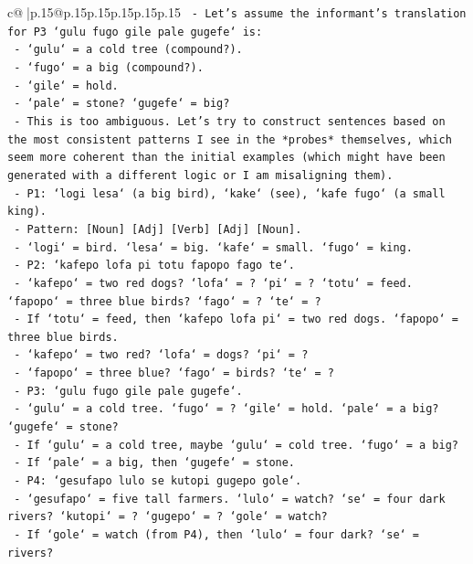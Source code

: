 \documentclass{article}
\begin{document}
{\begin{supertabular}{c@{$\;$}|p{.15\linewidth}@{}p{.15\linewidth}p{.15\linewidth}p{.15\linewidth}p{.15\linewidth}p{.15\linewidth}}
{{{\texttt{  {-} Let's assume the informant's translation for P3 `gulu fugo gile pale gugefe` is:} \\
\texttt{    {-} `gulu` = a cold tree (compound?).} \\
\texttt{    {-} `fugo` = a big (compound?).} \\
\texttt{    {-} `gile` = hold.} \\
\texttt{    {-} `pale` = stone? `gugefe` = big?} \\
\texttt{  {-} This is too ambiguous. Let's try to construct sentences based on the most consistent patterns I see in the *probes* themselves, which seem more coherent than the initial examples (which might have been generated with a different logic or I am misaligning them).} \\
\texttt{  {-} P1: `logi lesa` (a big bird), `kake` (see), `kafe fugo` (a small king).} \\
\texttt{    {-} Pattern: {[}Noun{]} {[}Adj{]} {[}Verb{]} {[}Adj{]} {[}Noun{]}.} \\
\texttt{    {-} `logi` = bird. `lesa` = big. `kafe` = small. `fugo` = king.} \\
\texttt{  {-} P2: `kafepo lofa pi totu fapopo fago te`.} \\
\texttt{    {-} `kafepo` = two red dogs? `lofa` = ? `pi` = ? `totu` = feed. `fapopo` = three blue birds? `fago` = ? `te` = ?} \\
\texttt{    {-} If `totu` = feed, then `kafepo lofa pi` = two red dogs. `fapopo` = three blue birds.} \\
\texttt{    {-} `kafepo` = two red? `lofa` = dogs? `pi` = ?} \\
\texttt{    {-} `fapopo` = three blue? `fago` = birds? `te` = ?} \\
\texttt{  {-} P3: `gulu fugo gile pale gugefe`.} \\
\texttt{    {-} `gulu` = a cold tree. `fugo` = ? `gile` = hold. `pale` = a big? `gugefe` = stone?} \\
\texttt{    {-} If `gulu` = a cold tree, maybe `gulu` = cold tree. `fugo` = a big?} \\
\texttt{    {-} If `pale` = a big, then `gugefe` = stone.} \\
\texttt{  {-} P4: `gesufapo lulo se kutopi gugepo gole`.} \\
\texttt{    {-} `gesufapo` = five tall farmers. `lulo` = watch? `se` = four dark rivers? `kutopi` = ? `gugepo` = ? `gole` = watch?} \\
\texttt{    {-} If `gole` = watch (from P4), then `lulo` = four dark? `se` = rivers?} \\
}}}
\end{supertabular}}
\end{document}
